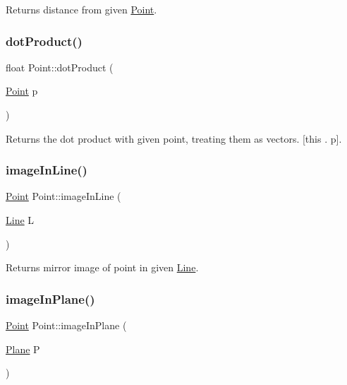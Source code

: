 Returns distance from given \mbox{\hyperlink{class_point}{Point}}. 

\mbox{\label{class_point_acf25ade0104bfa1c292eeb2da4d5aa2c}} 
\subsubsection{\texorpdfstring{dot\+Product()}{dotProduct()}}
{\footnotesize\ttfamily float Point\+::dot\+Product (\begin{DoxyParamCaption}\item[{\mbox{\hyperlink{class_point}{Point}}}]{p }\end{DoxyParamCaption})}



Returns the dot product with given point, treating them as vectors. \mbox{[}this . p\mbox{]}. 

\mbox{\label{class_point_a6db21f293bd4a7eab01b04882a5021fd}} 
\subsubsection{\texorpdfstring{image\+In\+Line()}{imageInLine()}}
{\footnotesize\ttfamily \mbox{\hyperlink{class_point}{Point}} Point\+::image\+In\+Line (\begin{DoxyParamCaption}\item[{\mbox{\hyperlink{class_line}{Line}}}]{L }\end{DoxyParamCaption})}



Returns mirror image of point in given \mbox{\hyperlink{class_line}{Line}}. 

\mbox{\label{class_point_a2350375c6bb6c3bb810ae79c99d2a53c}} 
\subsubsection{\texorpdfstring{image\+In\+Plane()}{imageInPlane()}}
{\footnotesize\ttfamily \mbox{\hyperlink{class_point}{Point}} Point\+::image\+In\+Plane (\begin{DoxyParamCaption}\item[{\mbox{\hyperlink{class_plane}{Plane}}}]{P }\end{DoxyParamCaption})}



